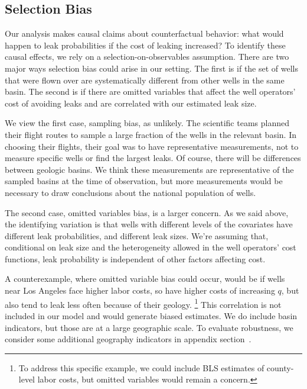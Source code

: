 \subsection{Selection Bias}
\label{sec:selection-bias}

Our analysis makes causal claims about counterfactual behavior: what would happen to leak probabilities if the cost of leaking increased?
To identify these causal effects, we rely on a selection-on-observables assumption.
There are two major ways selection bias could arise in our setting.
The first is if the set of wells that were flown over are systematically different from other wells in the same basin.
The second is if there are omitted variables that affect the well operators' cost of avoiding leaks and are correlated with our estimated leak size.


We view the first case, sampling bias, as unlikely.
The scientific teams planned their flight routes to sample a large fraction of the wells in the relevant basin.
In choosing their flights, their goal was to have representative measurements, not to measure specific wells or find the largest leaks.
Of course, there will be differences between geologic basins.
We think these measurements are representative of the sampled basins at the time of observation, but more measurements would be necessary to draw conclusions about the national population of wells.

The second case, omitted variables bias, is a larger concern.
As we said above, the identifying variation is that wells with different levels of the covariates have different leak probabilities, and different leak sizes.
We're assuming that, conditional on leak size and the heterogeneity allowed in the well operators' cost functions, leak probability is independent of other factors affecting cost.

A counterexample, where omitted variable bias could occur, would be if wells near Los Angeles face higher labor costs, so have higher costs of increasing \(q\), but also tend to leak less often because of their geology.%
\footnote{To address this specific example, we could include \gls{BLS} estimates of county-level labor costs, but omitted variables would remain a concern.}
This correlation is not included in our model and would generate biased estimates.
We do include basin indicators, but those are at a large geographic scale.
To evaluate robustness, we consider some additional geography indicators in appendix section~\iftoggle{usexr}{\ref{app:robustness-to-alternative-sets-of-variables}}{A6}.

